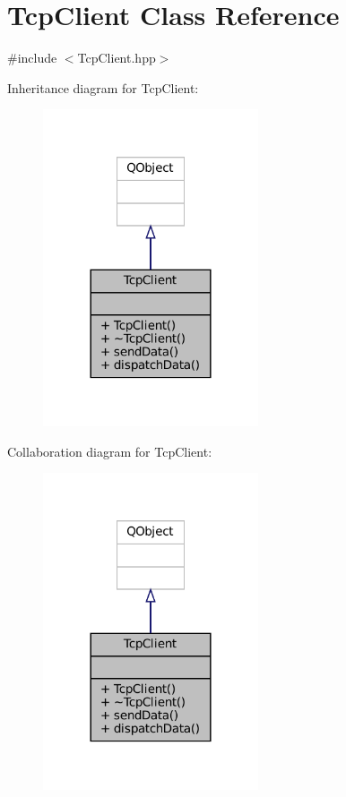 \hypertarget{classTcpClient}{}\section{Tcp\+Client Class Reference}
\label{classTcpClient}


{\ttfamily \#include $<$Tcp\+Client.\+hpp$>$}



Inheritance diagram for Tcp\+Client\+:
\nopagebreak
\begin{figure}[H]
\begin{center}
\leavevmode
\includegraphics[width=180pt]{classTcpClient__inherit__graph}
\end{center}
\end{figure}


Collaboration diagram for Tcp\+Client\+:
\nopagebreak
\begin{figure}[H]
\begin{center}
\leavevmode
\includegraphics[width=180pt]{classTcpClient__coll__graph}
\end{center}
\end{figure}
